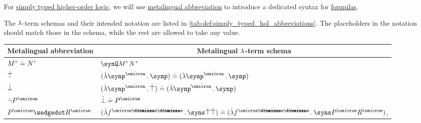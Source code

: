 \begin{definition}\label{def:simply_typed_hol_abbreviations}
  For \hyperref[def:simply_typed_hol]{simply typed higher-order logic}, we will use \hyperref[con:metalingual_abbreviation]{metalingual abbreviation} to introduce a dedicated syntax for \hyperref[def:simply_typed_hol_formula]{formulas}.

  The \( {\mathrm \lambda} \)-term schemas and their intended notation are listed in \cref{tab:def:simply_typed_hol_abbreviations}. The placeholders in the notation should match those in the schema, while the rest are allowed to take any value.

  \begin{table}
    \begin{center}
      \begin{tabular}{l l}
        \toprule
        \multicolumn{1}{c}{Metalingual abbreviation}        & \multicolumn{1}{c}{Metalingual \( {\mathrm \lambda} \)-term schema}                                                                                                                                                                          \\
        \midrule
        \( M^\tau \doteq N^\tau \)                          & \( \synQ M^\tau N^\tau \)                                                                                                                                                                                                             \\
        \( \dot{\top} \)                                       & \( (\qabs {\synp^{\syn\omicron}} \synp) \syneq (\qabs {\synp^{\syn\omicron}} \synp) \)                                                                                                                                                \\
        \( \dot{\bot} \)                                       & \( (\qabs {\synp^{\syn\omicron}} \syntop) \syneq (\qabs {\synp^{\syn\omicron}} \synp) \)                                                                                                                                              \\
        \( \synneg P^{\syn\omicron} \)                      & \( \synbot \syneq P^{\syn\omicron} \)                                                                                                                                                                                                 \\
        \( P^{\syn\omicron} \synwedge R^{\syn\omicron} \)   & \( (\qabs {f^{\syn\omicron \synimplies \syn\omicron \synimplies \syn\omicron}} \syns \syntop \syntop) \syneq (\qabs {f^{\syn\omicron \synimplies \syn\omicron \synimplies \syn\omicron}} \syns P^{\syn\omicron} R^{\syn\omicron}) \), \\

\end{tabular}
\end{center}
\end{table}
\end{definition}
